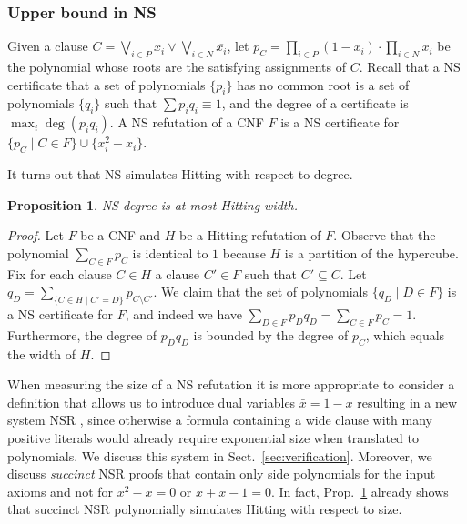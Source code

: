 \documentclass[11pt]{article}
\newcommand{\scterm}[1]{{\textrm{\sc #1}}}
\newcommand{\hit}{\scterm{Hitting}}
\newcommand{\ns}{\scterm{NS}}
\newcommand{\nsr}{\scterm{NSR}}
\newcommand{\olnot}[1]{\overline{#1}}
\newcommand{\set}[1]{\{#1\}}
\newcommand{\union}{\cup}
\numberwithin{equation}{section}
\newtheorem{proposition}[theorem]{Proposition}
\begin{document}
\subsubsection{Upper bound in {\ns}}

Given a clause
$C=\bigvee_{i\in P}x_i \lor \bigvee_{i\in N}\olnot{x_i}$, let
$p_C = \prod_{i\in P} (1-x_i) \cdot \prod_{i\in N} x_i$ be the
polynomial whose roots are the satisfying assignments of $C$. Recall
that a {\ns} certificate that a set of polynomials $\set{p_i}$ has no common root
is a set of polynomials $\set{q_i}$ such that $\sum p_iq_i\equiv1$, 
and the degree of a certificate is $\max_i \deg(p_iq_i)$. A
{\ns} refutation of a CNF $F$ is a {\ns} 
certificate for $\set{p_C \mid C\in F} \union \set{x_i^2-x_i}$.

It turns out that {\ns} simulates {\hit} with respect to degree.
\begin{proposition} \label{prop:ns-degree-simulation}
  {\ns} degree is at most {\hit} width. 
\end{proposition}

\begin{proof}
  Let $F$ be a CNF and $H$ be a {\hit} refutation of $F$.
%
  Observe that the polynomial $\sum_{C\in F} p_C$ is identical to $1$
  because $H$ is a partition of the hypercube.
%
  Fix for each clause $C\in H$ a clause $C' \in F$ such that
  $C' \subseteq C$. Let
  $q_D = \sum_{\{C\in H \mid C'=D\}}p_{C\setminus C'}$.
%
  We claim that the set of polynomials $\{q_D \mid D \in F\}$ is a
  {\ns} certificate for $F$, and indeed we have
  $\sum_{D\in F}p_Dq_D=\sum_{C\in F}p_C=1$. Furthermore, the degree of
  $p_Dq_D$ is bounded by the degree of $p_C$, which equals the width
  of $H$.
\end{proof}

When measuring the size of a {\ns} refutation it is more appropriate to consider a definition that allows us to introduce dual variables $\bar{x}=1-x$ \cite{ABSRW02} resulting in a new system {\nsr} \cite{dRLNS21}, since otherwise a formula containing a wide clause with many positive literals would already require exponential size when translated to polynomials. We discuss this system in Sect.~\ref{sec:verification}. Moreover, we discuss \emph{succinct} {\nsr} proofs that contain only side polynomials for the input axioms and not for $x^2-x=0$ or $x+\bar{x}-1=0$.
In fact, Prop.~\ref{prop:ns-degree-simulation} already shows that succinct {\nsr} polynomially simulates {\hit} with respect to size.
\end{document}
